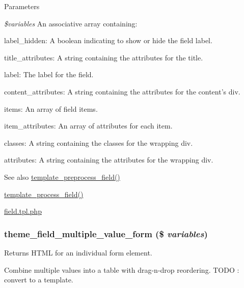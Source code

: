 \begin{DoxyParams}{Parameters}
\item[{\em \$variables}]An associative array containing:
\begin{DoxyItemize}
\item label\_\-hidden: A boolean indicating to show or hide the field label.
\item title\_\-attributes: A string containing the attributes for the title.
\item label: The label for the field.
\item content\_\-attributes: A string containing the attributes for the content's div.
\item items: An array of field items.
\item item\_\-attributes: An array of attributes for each item.
\item classes: A string containing the classes for the wrapping div.
\item attributes: A string containing the attributes for the wrapping div.
\end{DoxyItemize}\end{DoxyParams}
\begin{DoxySeeAlso}{See also}
\hyperlink{group__field_ga6dc60d3c482230f380dd3b112487d717}{template\_\-preprocess\_\-field()} 

\hyperlink{group__field_ga4fd3ce05ef61810b1f66283302ab7cad}{template\_\-process\_\-field()} 

\hyperlink{field_8tpl_8php}{field.tpl.php} 
\end{DoxySeeAlso}
\hypertarget{group__themeable_ga74b93c09d317f6348b32ad1e6695c61e}{
\subsubsection[{theme\_\-field\_\-multiple\_\-value\_\-form}]{\setlength{\rightskip}{0pt plus 5cm}theme\_\-field\_\-multiple\_\-value\_\-form (\$ {\em variables})}}
\label{group__themeable_ga74b93c09d317f6348b32ad1e6695c61e}
Returns HTML for an individual form element.

Combine multiple values into a table with drag-\/n-\/drop reordering. TODO : convert to a template.


